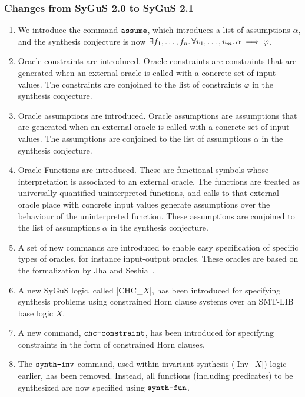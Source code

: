 \documentclass[english,a4paper,10pt]{article}
\begin{document}
\subsubsection{Changes from SyGuS 2.0 to SyGuS 2.1}
\begin{enumerate}
\item We introduce the command $\texttt{assume}$, which introduces a list of assumptions $\alpha$, and the 
synthesis conjecture is now 
$\exists f_1, \ldots, f_n \ldotp \forall v_1, \ldots,
v_m \ldotp \alpha \implies \varphi$. 

\item Oracle constraints are introduced. Oracle constraints are constraints that are generated when an external oracle is called with a concrete set of input values. The constraints are conjoined to the list of constraints $\varphi$ in the synthesis conjecture.

\item Oracle assumptions are introduced. Oracle assumptions are assumptions that are generated when an external oracle is called with a concrete set of input values. The assumptions are conjoined to the list of assumptions $\alpha$ in the synthesis conjecture.

\item Oracle Functions are introduced. These are functional symbols whose interpretation is associated to an external oracle. The functions are treated as universally quantified uninterpreted functions, and calls to that external oracle place with concrete input values generate assumptions over the behaviour of the uninterpreted function. These assumptions are conjoined to the list of assumptions $\alpha$ in the synthesis conjecture.

\item A set of new commands are introduced to enable easy specification of specific types of oracles, for instance input-output oracles. These oracles are based on the formalization by Jha and Seshia~\cite{oracles}.

\item A new SyGuS logic, called \code|CHC_$X$|,
has been introduced for specifying synthesis problems using constrained Horn clause systems
over an SMT-LIB base logic $X$.

\item A new command, $\texttt{chc-constraint}$, has been introduced for specifying constraints in the form of constrained Horn clauses.

\item The $\texttt{synth-inv}$ command, used within invariant synthesis (\code|Inv_$X$|) logic earlier, has been removed.
Instead, all functions (including predicates) to be synthesized are now specified using $\texttt{synth-fun}$.


\end{enumerate}
\end{document}
